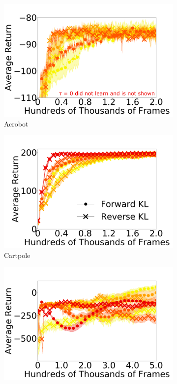 \documentclass{article}
\begin{document}
\begin{figure}[t]
  \centering
  \begin{subfigure}[b]{0.25\linewidth}
    \centering
    \includegraphics[width=\columnwidth]{figs/deep/discrete/labeled_acrobot.png} 
    \caption{Acrobot
    }\label{fig:acrobot}
  \end{subfigure}%
  \begin{subfigure}[b]{0.25\linewidth}
    \centering
    \includegraphics[width=\columnwidth]{figs/deep/discrete/CartPole_all_kl.png} 
    \caption{Cartpole
    }\label{fig:cartpole}
  \end{subfigure}%
  \begin{subfigure}[b]{0.25\linewidth}
    \centering
    \includegraphics[width=\columnwidth]{figs/deep/discrete/UNLABELED_LunarLander_all_kl.png}

\end{subfigure}
\end{figure}
\end{document}
